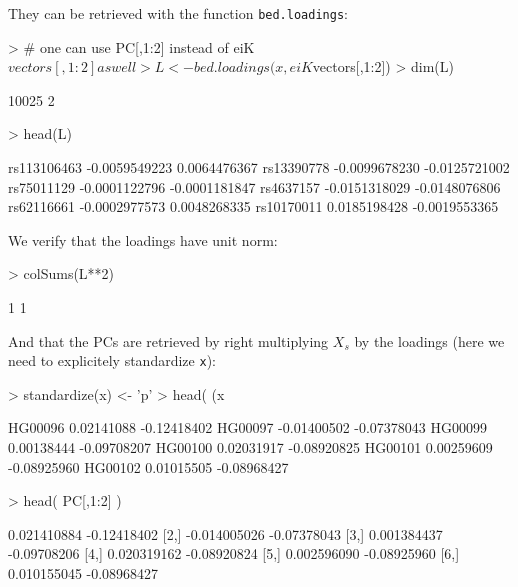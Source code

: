 \documentclass{article}
\renewenvironment{Schunk}{\vspace{\topsep}}{\vspace{\topsep}}
\begin{document}
  They can be retrieved with the function \verb!bed.loadings!:
\begin{Schunk}
\begin{Sinput}
> # one can use PC[,1:2] instead of eiK$vectors[,1:2] as well
> L <- bed.loadings(x, eiK$vectors[,1:2])
> dim(L)
\end{Sinput}
\begin{Soutput}
[1] 10025     2
\end{Soutput}
\begin{Sinput}
> head(L)
\end{Sinput}
\begin{Soutput}
                     [,1]          [,2]
rs113106463 -0.0059549223  0.0064476367
rs13390778  -0.0099678230 -0.0125721002
rs75011129  -0.0001122796 -0.0001181847
rs4637157   -0.0151318029 -0.0148076806
rs62116661  -0.0002977573  0.0048268335
rs10170011   0.0185198428 -0.0019553365
\end{Soutput}
\end{Schunk}

We verify that the loadings have unit norm:
\begin{Schunk}
\begin{Sinput}
> colSums(L**2)
\end{Sinput}
\begin{Soutput}
[1] 1 1
\end{Soutput}
\end{Schunk}

And that the PCs are retrieved by right multiplying $X_s$ by the loadings (here we need 
to explicitely standardize \verb!x!):
\begin{Schunk}
\begin{Sinput}
> standardize(x) <- 'p'
> head( (x %
\end{Sinput}
\begin{Soutput}
               [,1]        [,2]
HG00096  0.02141088 -0.12418402
HG00097 -0.01400502 -0.07378043
HG00099  0.00138444 -0.09708207
HG00100  0.02031917 -0.08920825
HG00101  0.00259609 -0.08925960
HG00102  0.01015505 -0.08968427
\end{Soutput}
\begin{Sinput}
> head( PC[,1:2] )
\end{Sinput}
\begin{Soutput}
             [,1]        [,2]
[1,]  0.021410884 -0.12418402
[2,] -0.014005026 -0.07378043
[3,]  0.001384437 -0.09708206
[4,]  0.020319162 -0.08920824
[5,]  0.002596090 -0.08925960
[6,]  0.010155045 -0.08968427
\end{Soutput}
\end{Schunk}
\end{document}

